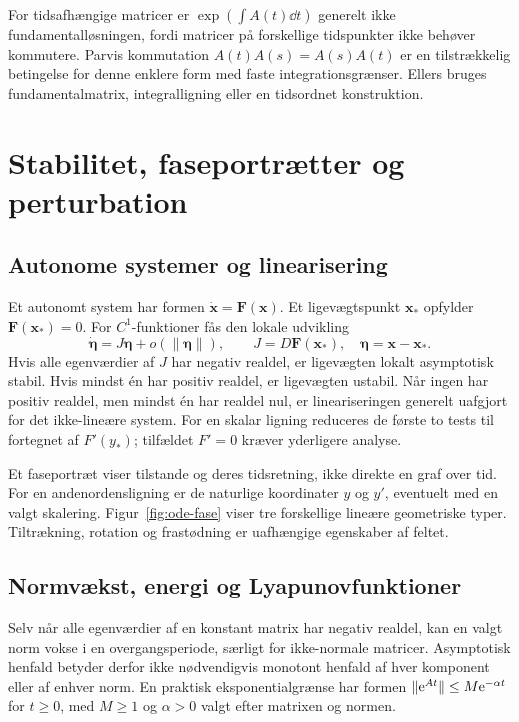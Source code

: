 For tidsafhængige matricer er
$\exp(\int A(t)\dd t)$ generelt ikke fundamentalløsningen, fordi matricer
på forskellige tidspunkter ikke behøver kommutere. Parvis kommutation
$A(t)A(s)=A(s)A(t)$ er en tilstrækkelig betingelse for denne enklere
form med faste integrationsgrænser. Ellers bruges fundamentalmatrix,
integralligning eller en tidsordnet konstruktion.

\section{Stabilitet, faseportrætter og perturbation}
\label{sec:ode-stabilitet}
\subsection{Autonome systemer og linearisering}
Et autonomt system har formen
$\dot{\boldsymbol{x}}=\boldsymbol{F}(\boldsymbol{x})$.
Et ligevægtspunkt $\boldsymbol{x}_*$ opfylder
$\boldsymbol{F}(\boldsymbol{x}_*)=0$. For $C^1$-funktioner fås den
lokale udvikling
\[
 \dot{\boldsymbol{\eta}}=J\boldsymbol{\eta}+o(\|\boldsymbol{\eta}\|),
 \qquad
 J=D\boldsymbol{F}(\boldsymbol{x}_*),\quad
 \boldsymbol{\eta}=\boldsymbol{x}-\boldsymbol{x}_*.
\]
Hvis alle egenværdier af $J$ har negativ realdel, er ligevægten lokalt
asymptotisk stabil. Hvis mindst én har positiv realdel, er ligevægten
ustabil. Når ingen har positiv realdel, men mindst én har realdel nul,
er lineariseringen generelt uafgjort for det ikke-lineære system.
For en skalar ligning reduceres de første to tests til fortegnet af
$F'(y_*)$; tilfældet $F'=0$ kræver yderligere analyse.

Et faseportræt viser tilstande og deres tidsretning, ikke direkte en
graf over tid. For en andenordensligning er de naturlige koordinater
$y$ og $y'$, eventuelt med en valgt skalering. Figur~\ref{fig:ode-fase}
viser tre forskellige lineære geometriske typer. Tiltrækning, rotation
og frastødning er uafhængige egenskaber af feltet.



\subsection{Normvækst, energi og Lyapunovfunktioner}
Selv når alle egenværdier af en konstant matrix har negativ realdel,
kan en valgt norm vokse i en overgangsperiode, særligt for ikke-normale
matricer. Asymptotisk henfald betyder derfor ikke nødvendigvis
monotont henfald af hver komponent eller af enhver norm. En praktisk
eksponentialgrænse har formen
$\|\mathrm{e}^{At}\|\le M\mathrm{e}^{-\alpha t}$ for $t\ge0$, med $M\ge1$ og
$\alpha>0$ valgt efter matrixen og normen.

